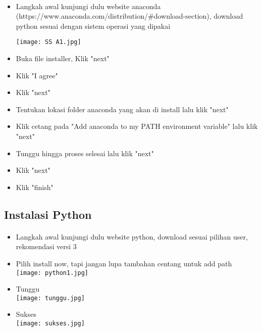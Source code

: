 \documentclass{article}
\begin{document}
\paragraph{}
\begin{itemize}
	\item Langkah awal kunjungi dulu website anaconda (https://www.anaconda.com/distribution/\#download-section), download python sesuai dengan sistem operasi yang dipakai\\
	\begin{center}
	    	\texttt{[image: SS A1.jpg]} 
	\end{center}

	\item Buka file installer, Klik "next"\\
	
	\item Klik "I agree"\\
	
	\item Klik "next"\\

	\item Tentukan lokasi folder anaconda yang akan di install lalu klik "next"\\
	
	\item Klik cetang pada "Add anaconda to my PATH environment variable" lalu klik "next"\\

	\item Tunggu hingga proses selesai lalu klik "next"\\

	\item Klik "next"\\
	
	\item Klik "finish"\\

\end{itemize}
\subsection{Instalasi Python}
\paragraph{}
\begin{itemize}
	\item Langkah awal kunjungi dulu website python, download sesuai pilihan user, rekomendasi versi 3 
	\item Pilih install now, tapi jangan lupa tambahan centang untuk add path\\
	\texttt{[image: python1.jpg]}\\ 
	\item Tunggu\\
	\texttt{[image: tunggu.jpg]}\\ 
	\item Sukses\\
	\texttt{[image: sukses.jpg]}\\

\end{itemize}
\end{document}

